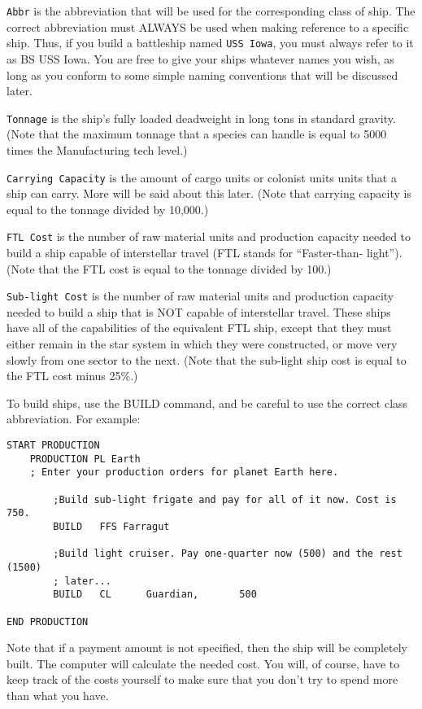 \documentclass[10pt,titlepage]{article}
\begin{document}
\texttt{Abbr} is the abbreviation that will be used for the corresponding class of
ship.  The correct abbreviation must ALWAYS be used when making reference to
a specific ship.  Thus, if you build a battleship named \texttt{USS Iowa}, you must
always refer to it as BS USS Iowa.  You are free to give your ships whatever
names you wish, as long as you conform to some simple naming conventions that
will be discussed later.

\texttt{Tonnage} is the ship's fully loaded deadweight in long tons in standard
gravity.  (Note that the maximum tonnage that a species can handle is equal
to 5000 times the Manufacturing tech level.)

\texttt{Carrying Capacity} is the amount of cargo units or colonist units units that
a ship can carry.  More will be said about this later.  (Note that carrying
capacity is equal to the tonnage divided by 10,000.)

\texttt{FTL Cost} is the number of raw material units and production capacity needed
to build a ship capable of interstellar travel (FTL stands for ``Faster-than-
light'').  (Note that the FTL cost is equal to the tonnage divided by 100.)

\texttt{Sub-light Cost} is the number of raw material units and production capacity
needed to build a ship that is NOT capable of interstellar travel.  These ships
have all of the capabilities of the equivalent FTL ship, except that they must
either remain in the star system in which they were constructed, or move very
slowly from one sector to the next.  (Note that the sub-light ship cost is
equal to the FTL cost minus 25\%.)

To build ships, use the BUILD command, and be careful to use the correct class
abbreviation.  For example:
\begin{verbatim}
START PRODUCTION
    PRODUCTION PL Earth
    ; Enter your production orders for planet Earth here.

        ;Build sub-light frigate and pay for all of it now. Cost is 750.
        BUILD   FFS Farragut

        ;Build light cruiser. Pay one-quarter now (500) and the rest (1500)
        ; later...
        BUILD   CL      Guardian,       500

END PRODUCTION
\end{verbatim}

Note that if a payment amount is not specified, then the ship will be
completely built.  The computer will calculate the needed cost.  You will, of
course, have to keep track of the costs yourself to make sure that you don't
try to spend more than what you have.
\end{document}
